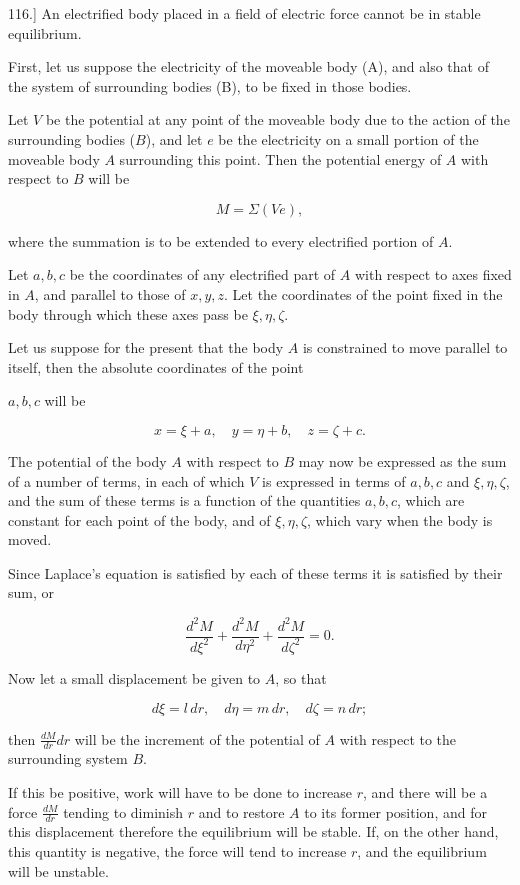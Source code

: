 \documentclass[11pt,a4paper]{article}
\begin{document}
116.] An electrified body placed in a field of electric force cannot be in stable equilibrium.

First, let us suppose the electricity of the moveable body (A), and also that of the system of surrounding bodies (B), to be fixed in those bodies.

Let $V$ be the potential at any point of the moveable body due to the action of the surrounding bodies ($B$), and let $e$ be the electricity on a small portion of the moveable body $A$ surrounding this point. Then the potential energy of $A$ with respect to $B$ will be

\[
M = \Sigma(Ve),
\]

where the summation is to be extended to every electrified portion of $A$.

Let $a,b,c$ be the coordinates of any electrified part of $A$ with respect to axes fixed in $A$, and parallel to those of $x,y,z$. Let the coordinates of the point fixed in the body through which these axes pass be $\xi,\eta,\zeta$.

Let us suppose for the present that the body $A$ is constrained to move parallel to itself, then the absolute coordinates of the point

$a,b,c$ will be

\[
x=\xi+a,\quad y=\eta+b,\quad z=\zeta+c.
\]

The potential of the body $A$ with respect to $B$ may now be expressed as the sum of a number of terms, in each of which $V$ is expressed in terms of $a,b,c$ and $\xi,\eta,\zeta$, and the sum of these terms is a function of the quantities $a,b,c$, which are constant for each point of the body, and of $\xi,\eta,\zeta$, which vary when the body is moved.

Since Laplace's equation is satisfied by each of these terms it is satisfied by their sum, or

\[
\frac{d^2M}{d\xi^2} + \frac{d^2M}{d\eta^2} + \frac{d^2M}{d\zeta^2} = 0.
\]

Now let a small displacement be given to $A$, so that

\[
d\xi=l\,dr,\quad d\eta=m\,dr,\quad d\zeta=n\,dr;
\]

then $\frac{dM}{dr}dr$ will be the increment of the potential of $A$ with respect to the surrounding system $B$.

If this be positive, work will have to be done to increase $r$, and there will be a force $\frac{dM}{dr}$ tending to diminish $r$ and to restore $A$ to its former position, and for this displacement therefore the equilibrium will be stable. If, on the other hand, this quantity is negative, the force will tend to increase $r$, and the equilibrium will be unstable.
\end{document}
